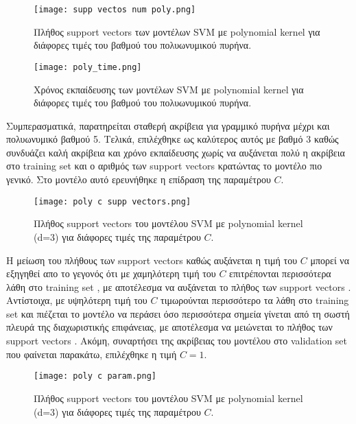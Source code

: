\documentclass[a4paper,12pt]{article}
\newcommand{\lt}{\latintext}
\newcommand{\gt}{\greektext}
\begin{document}
\begin{figure}[H]
    \centering
    \texttt{[image: supp vectos num poly.png]}
    \caption{Πλήθος \lt support vectors \gt των μοντέλων \lt SVM \gt με \lt polynomial kernel \gt για διάφορες τιμές του βαθμού του πολυωνυμικού πυρήνα.}
    \label{fig:poly_svm supp vectors}
\end{figure}

\begin{figure}[H]
    \centering
    \texttt{[image: poly\_time.png]}
    \caption{Χρόνος εκπαίδευσης των μοντέλων \lt SVM \gt με \lt polynomial kernel \gt για διάφορες τιμές του βαθμού του πολυωνυμικού πυρήνα.}
    \label{fig:poly_svm time}
\end{figure}
Συμπερασματικά, παρατηρείται σταθερή ακρίβεια για γραμμικό πυρήνα μέχρι και πολυωνυμικό βαθμού 5. Τελικά, επιλέχθηκε ως καλύτερος αυτός με βαθμό 3 καθώς συνδυάζει καλή 
ακρίβεια και χρόνο εκπαίδευσης χωρίς να αυξάνεται πολύ η ακρίβεια στο \lt training set \gt και ο αριθμός των \lt support vectors \gt κρατώντας το μοντέλο πιο γενικό.
Στο μοντέλο αυτό ερευνήθηκε η επίδραση της παραμέτρου $C$.

\begin{figure}[H]
    \centering
    \texttt{[image: poly c supp vectors.png]}
    \caption{Πλήθος \lt support vectors \gt του μοντέλου \lt SVM \gt με \lt polynomial kernel (d=3) \gt για διάφορες τιμές της παραμέτρου $C$.}
    \label{fig:poly c supp}
\end{figure}

Η μείωση του πλήθους των \lt support vectors \gt καθώς αυξάνεται η τιμή του $C$ μπορεί να εξηγηθεί απο το γεγονός ότι με χαμηλότερη τιμή του $C$ επιτρέπονται
περισσότερα λάθη στο \lt training set \gt, με αποτέλεσμα να αυξάνεται το πλήθος των \lt support vectors \gt. Αντίστοιχα, με υψηλότερη τιμή του $C$ τιμωρούνται
περισσότερο τα λάθη στο \lt training set \gt και πιέζεται το μοντέλο να περάσει όσο περισσότερα σημεία γίνεται από τη σωστή πλευρά της διαχωριστικής επιφάνειας, 
με αποτέλεσμα να μειώνεται το πλήθος των \lt support vectors \gt. Ακόμη, συναρτήσει της ακρίβειας του μοντέλου στο \lt validation set \gt που φαίνεται παρακάτω, επιλέχθηκε η τιμή $C=1$.

\begin{figure}[H]
    \centering
    \texttt{[image: poly c param.png]}
    \caption{Πλήθος \lt support vectors \gt του μοντέλου \lt SVM \gt με \lt polynomial kernel (d=3) \gt για διάφορες τιμές της παραμέτρου $C$.}
    \label{fig:poly c param}
\end{figure}
\end{document}
